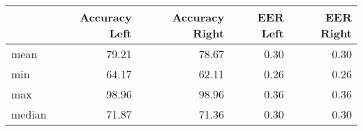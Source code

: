 \begin{tabular}{lrrrr}
\toprule
{} &  Accuracy Left &  Accuracy Right &  EER Left &  EER Right \\
\midrule
mean   &          79.21 &           78.67 &      0.30 &       0.30 \\
min    &          64.17 &           62.11 &      0.26 &       0.26 \\
max    &          98.96 &           98.96 &      0.36 &       0.36 \\
median &          71.87 &           71.36 &      0.30 &       0.30 \\
\bottomrule
\end{tabular}
